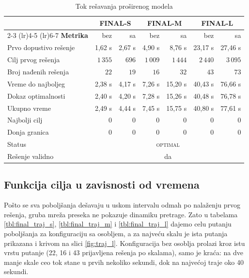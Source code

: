 \documentclass[12pt,oneside]{memoir}
\begin{document}
\begin{table}[ht]
\centering
\caption{Tok rešavanja proširenog modela}
\label{tbl:final_tok}
\begin{tabular}{lrrrrrr}
\toprule
& \multicolumn{2}{c}{\textbf{FINAL-S}}
& \multicolumn{2}{c}{\textbf{FINAL-M}}
& \multicolumn{2}{c}{\textbf{FINAL-L}} \\
\cmidrule(lr){2-3} \cmidrule(lr){4-5} \cmidrule(lr){6-7}
\textbf{Metrika} & bez & sa & bez & sa & bez & sa \\
\midrule
Prvo dopustivo rešenje & 1,62 s   & 2,67 s & 4,90 s   & 8,76 s   & 23,17 s  & 27,46 s \\
Cilj prvog rešenja     & $1\,355$ & $696$  & $1\,009$ & $1\,444$ & $2\,440$ & $3\,095$ \\
Broj nađenih rešenja   & $22$     & $19$   & $16$     & $32$     & $43$     & $73$ \\
Vreme do najboljeg     & 2,38 s   & 4,17 s & 7,26 s   & 15,20 s  & 40,43 s  & 76,66 s \\
Dokaz optimalnosti     & 2,40 s   & 4,20 s & 7,28 s   & 15,26 s  & 40,48 s  & 76,78 s \\
Ukupno vreme           & 2,49 s   & 4,44 s & 7,45 s   & 15,75 s  & 40,80 s  & 77,61 s \\
Najbolji cilj          & $0$      & $0$    & $0$      & $0$      & $0$      & $0$ \\
Donja granica          & $0$      & $0$    & $0$      & $0$      & $0$      & $0$ \\
Status                 & \multicolumn{6}{c}{\textsc{optimal}} \\
Rešenje validno        & \multicolumn{6}{c}{da} \\
\bottomrule
\end{tabular}
\end{table}

\subsection{Funkcija cilja u zavisnosti od vremena}
\label{sec:finalna_cilj_vreme}

Pošto se sva poboljšanja dešavaju u uskom intervalu odmah po nalaženju
prvog rešenja, gruba mreža preseka ne pokazuje dinamiku pretrage. Zato
u tabelama \ref{tbl:final_traj_s}, \ref{tbl:final_traj_m} i
\ref{tbl:final_traj_l} dajemo celu putanju poboljšanja za konfiguraciju
sa osobljem, a za najveću skalu je ista putanja prikazana i krivom na
slici \ref{fig:traj_l}. Konfiguracija bez osoblja prolazi kroz istu vrstu putanje
(22, 16 i 43 prijavljena rešenja po skalama), samo je kraća: na dve
manje skale ceo tok stane u prvih nekoliko sekundi, dok na najvećoj
traje oko 40 sekundi.
\end{document}
